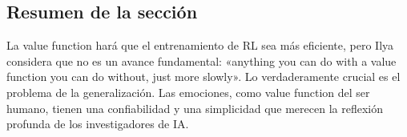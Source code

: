 \subsection{Resumen de la sección}

La value function hará que el entrenamiento de RL sea más eficiente, pero Ilya considera que no es un avance fundamental: «anything you can do with a value function you can do without, just more slowly». Lo verdaderamente crucial es el problema de la generalización. Las emociones, como value function del ser humano, tienen una confiabilidad y una simplicidad que merecen la reflexión profunda de los investigadores de IA.

